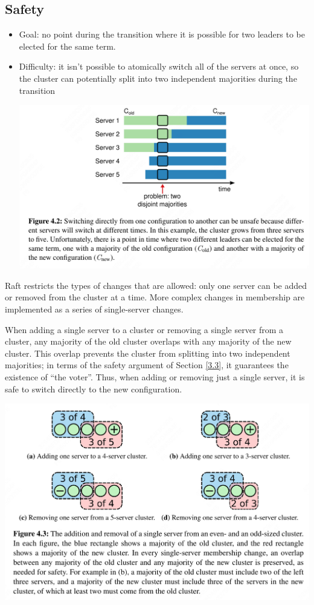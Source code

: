 \documentclass[11pt]{article}
\begin{document}
\subsection{Safety}
\label{sec:org1032c5d}
\begin{itemize}
\item Goal: no point during the transition where it is possible for two leaders to be elected for the same term.
\item Difficulty: it isn’t possible to atomically switch all of the servers at once, so the cluster can
potentially split into two independent majorities during the transition
\begin{center}
\includegraphics[width=.99\textwidth]{../../images/papers/15.png}
\label{4.2}
\end{center}
\end{itemize}

Raft restricts the types of changes that are allowed: only one server can be added or removed from the
cluster at a time. More complex changes in membership are implemented as a series of single-server
changes.

When adding a single server to a cluster or removing a single server from a cluster, any majority of
the old cluster overlaps with any majority of the new cluster. This overlap prevents the cluster from
splitting into two independent majorities; in terms of the safety argument of Section \ref{3.3}, it
guarantees the existence of ``the voter''. Thus, when adding or removing just a single server, it is
safe to switch directly to the new configuration.

\begin{center}
\includegraphics[width=.99\textwidth]{../../images/papers/16.png}
\label{}
\end{center}
\end{document}
